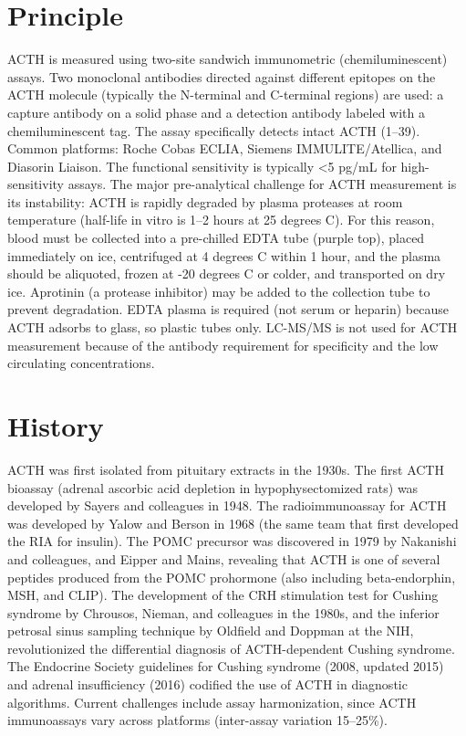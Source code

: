 \section*{Principle}
ACTH is measured using two-site sandwich immunometric (chemiluminescent) assays. Two monoclonal antibodies directed against different epitopes on the ACTH molecule (typically the N-terminal and C-terminal regions) are used: a capture antibody on a solid phase and a detection antibody labeled with a chemiluminescent tag. The assay specifically detects intact ACTH (1--39). Common platforms: Roche Cobas ECLIA, Siemens IMMULITE/Atellica, and Diasorin Liaison. The functional sensitivity is typically <5 pg/mL for high-sensitivity assays. The major pre-analytical challenge for ACTH measurement is its instability: ACTH is rapidly degraded by plasma proteases at room temperature (half-life in vitro is 1--2 hours at 25 degrees C). For this reason, blood must be collected into a pre-chilled EDTA tube (purple top), placed immediately on ice, centrifuged at 4 degrees C within 1 hour, and the plasma should be aliquoted, frozen at -20 degrees C or colder, and transported on dry ice. Aprotinin (a protease inhibitor) may be added to the collection tube to prevent degradation. EDTA plasma is required (not serum or heparin) because ACTH adsorbs to glass, so plastic tubes only. LC-MS/MS is not used for ACTH measurement because of the antibody requirement for specificity and the low circulating concentrations.

\section*{History}
ACTH was first isolated from pituitary extracts in the 1930s. The first ACTH bioassay (adrenal ascorbic acid depletion in hypophysectomized rats) was developed by Sayers and colleagues in 1948. The radioimmunoassay for ACTH was developed by Yalow and Berson in 1968 (the same team that first developed the RIA for insulin). The POMC precursor was discovered in 1979 by Nakanishi and colleagues, and Eipper and Mains, revealing that ACTH is one of several peptides produced from the POMC prohormone (also including beta-endorphin, MSH, and CLIP). The development of the CRH stimulation test for Cushing syndrome by Chrousos, Nieman, and colleagues in the 1980s, and the inferior petrosal sinus sampling technique by Oldfield and Doppman at the NIH, revolutionized the differential diagnosis of ACTH-dependent Cushing syndrome. The Endocrine Society guidelines for Cushing syndrome (2008, updated 2015) and adrenal insufficiency (2016) codified the use of ACTH in diagnostic algorithms. Current challenges include assay harmonization, since ACTH immunoassays vary across platforms (inter-assay variation 15--25\%).

